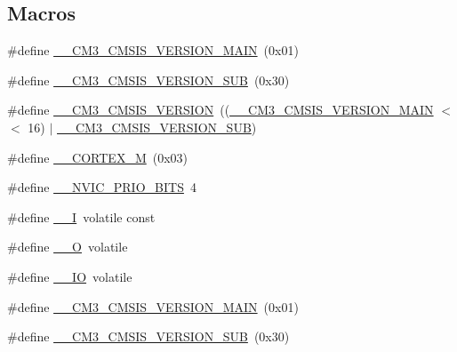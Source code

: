 \subsection*{Macros}
\begin{DoxyCompactItemize}
\item 
\#define \hyperlink{group___c_m_s_i_s___c_m3__core__definitions_gac1c1120e9fe082fac8225c60143ac79a}{\-\_\-\-\_\-\-C\-M3\-\_\-\-C\-M\-S\-I\-S\-\_\-\-V\-E\-R\-S\-I\-O\-N\-\_\-\-M\-A\-I\-N}~(0x01)
\item 
\#define \hyperlink{group___c_m_s_i_s___c_m3__core__definitions_ga9ff7a998d4b8b3c87bfaca6e78607950}{\-\_\-\-\_\-\-C\-M3\-\_\-\-C\-M\-S\-I\-S\-\_\-\-V\-E\-R\-S\-I\-O\-N\-\_\-\-S\-U\-B}~(0x30)
\item 
\#define \hyperlink{group___c_m_s_i_s___c_m3__core__definitions_gaf888c651cd8c93fd25364f9e74306a1c}{\-\_\-\-\_\-\-C\-M3\-\_\-\-C\-M\-S\-I\-S\-\_\-\-V\-E\-R\-S\-I\-O\-N}~((\hyperlink{group___c_m_s_i_s__core__definitions_gac1c1120e9fe082fac8225c60143ac79a}{\-\_\-\-\_\-\-C\-M3\-\_\-\-C\-M\-S\-I\-S\-\_\-\-V\-E\-R\-S\-I\-O\-N\-\_\-\-M\-A\-I\-N} $<$$<$ 16) $\vert$ \hyperlink{group___c_m_s_i_s__core__definitions_ga9ff7a998d4b8b3c87bfaca6e78607950}{\-\_\-\-\_\-\-C\-M3\-\_\-\-C\-M\-S\-I\-S\-\_\-\-V\-E\-R\-S\-I\-O\-N\-\_\-\-S\-U\-B})
\item 
\#define \hyperlink{group___c_m_s_i_s___c_m3__core__definitions_ga63ea62503c88acab19fcf3d5743009e3}{\-\_\-\-\_\-\-C\-O\-R\-T\-E\-X\-\_\-\-M}~(0x03)
\item 
\#define \hyperlink{group___c_m_s_i_s___c_m3__core__definitions_gae3fe3587d5100c787e02102ce3944460}{\-\_\-\-\_\-\-N\-V\-I\-C\-\_\-\-P\-R\-I\-O\-\_\-\-B\-I\-T\-S}~4
\item 
\#define \hyperlink{group___c_m_s_i_s___c_m3__core__definitions_gaf63697ed9952cc71e1225efe205f6cd3}{\-\_\-\-\_\-\-I}~volatile const
\item 
\#define \hyperlink{group___c_m_s_i_s___c_m3__core__definitions_ga7e25d9380f9ef903923964322e71f2f6}{\-\_\-\-\_\-\-O}~volatile
\item 
\#define \hyperlink{group___c_m_s_i_s___c_m3__core__definitions_gaec43007d9998a0a0e01faede4133d6be}{\-\_\-\-\_\-\-I\-O}~volatile
\item 
\#define \hyperlink{group___c_m_s_i_s___c_m3__core__definitions_gac1c1120e9fe082fac8225c60143ac79a}{\-\_\-\-\_\-\-C\-M3\-\_\-\-C\-M\-S\-I\-S\-\_\-\-V\-E\-R\-S\-I\-O\-N\-\_\-\-M\-A\-I\-N}~(0x01)
\item 
\#define \hyperlink{group___c_m_s_i_s___c_m3__core__definitions_ga9ff7a998d4b8b3c87bfaca6e78607950}{\-\_\-\-\_\-\-C\-M3\-\_\-\-C\-M\-S\-I\-S\-\_\-\-V\-E\-R\-S\-I\-O\-N\-\_\-\-S\-U\-B}~(0x30)
$$
\end{DoxyCompactItemize}
